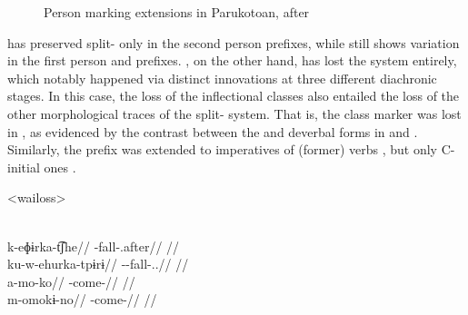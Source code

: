 \begin{figure}[hbt]
\centering
\setlength{\tabcolsep}{2pt}
  \caption{Person marking extensions in Parukotoan, after \textcite[94]{gildea1998}}
  \label{fig:par_ext}
\end{figure}

\hixka has preserved split- only in the second person prefixes, while \kaxui still shows variation in the first person and  prefixes.
\waiwai, on the other hand, has lost the system entirely, which notably happened via distinct innovations at three different diachronic stages.
In this case, the loss of the inflectional classes also entailed the loss of the other morphological traces of the split- system.
That is, the  class marker   was lost in \waiwai, as evidenced by the contrast between the \waiwai and \kaxui deverbal forms in  and .
Similarly, the  prefix  was extended to imperatives of (former)  verbs , but only C-initial ones \parencite[62]{waiwaihawkins1998}.

\pex<wailoss>
\begin{multicols}{2}
 \waiwai \parencite[][98]{waiwaihawkins1998}\\
\begingl
\gla k-eɸɨrka-t͡ʃhe//
\glb {}-fall-.after//
\glft {}//
\endgl
{} \kaxui \parencite[][49]{schuring2018kaxuyana}\\
\begingl
\gla ku-w-ehurka-tpɨrɨ//
\glb {}--fall-..//
\glft {}//
\endgl
{} \waiwai \parencite[][177]{waiwaihawkins1998}\\
\begingl
\gla a-mo-ko//
\glb {}-come-//
\glft {}//
\endgl
{} \hixka \parencite[][191]{hixkaryanaderby1985}\\
\begingl
\gla m-omokɨ-no//
\glb {}-come-//
\glft {}//
\endgl
\end{multicols}
\xe


